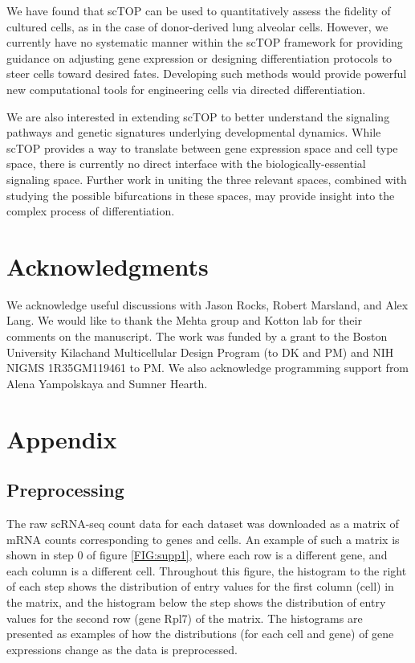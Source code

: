 \documentclass[aps,superscriptaddress, notitlepage,longbibliography]{revtex4-1}
\newcommand{\beginsupplement}{%
        \setcounter{table}{0}
        \renewcommand{\thetable}{S\arabic{table}}%
        \setcounter{figure}{0}
        \renewcommand{\thefigure}{S\arabic{figure}}%
     }
\begin{document}
We have found that scTOP can be used to quantitatively assess the fidelity of cultured cells, as in the case of donor-derived lung alveolar cells. However, we currently have no systematic manner within the scTOP framework for providing guidance on adjusting gene expression or designing differentiation protocols to steer cells toward desired fates. Developing such methods would provide powerful new computational tools for engineering cells via directed differentiation.

We are also interested in extending scTOP to better understand the signaling pathways and genetic signatures underlying developmental dynamics. While scTOP provides a way to translate between gene expression space and cell type space, there is currently no direct interface with the biologically-essential signaling space. Further work in uniting the three relevant spaces, combined with studying the possible bifurcations in these spaces, may provide insight into the complex process of differentiation.

\section*{Acknowledgments}
We acknowledge useful discussions with Jason Rocks, Robert Marsland, and Alex Lang. We would like to thank the Mehta group and Kotton lab for their comments on the manuscript. The work was funded by a grant to the Boston University Kilachand Multicellular Design Program (to DK and PM) and NIH NIGMS 1R35GM119461 to PM. We also acknowledge programming support from Alena Yampolskaya and Sumner Hearth.


\section*{Appendix}
\beginsupplement
\subsection{Preprocessing} \label{preprocessing}
The raw scRNA-seq count data for each dataset was downloaded as a matrix of mRNA counts corresponding to genes and cells. An example of such a matrix is shown in step 0 of figure \ref{FIG:supp1}, where each row is a different gene, and each column is a different cell. Throughout this figure, the histogram to the right of each step shows the distribution of entry values for the first column (cell) in the matrix, and the histogram below the step shows the distribution of entry values for the second row (gene Rpl7) of the matrix. The histograms are presented as examples of how the distributions (for each cell and gene) of gene expressions change as the data is preprocessed.
\end{document}
